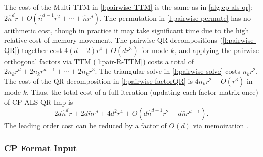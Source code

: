 \documentclass{article}
\begin{document}
\begin{algorithm}
  \caption{CP-ALS-QR-Imp}
  \label{alg:cp-als-pairwise-qr}
  
\end{algorithm}

The cost of the Multi-TTM in \cref{l:pairwise-TTM} is the same as in \cref{alg:cp-als-qr}: $2\hat{n}^dr+O(\hat{n}^{d-1}r^2 + \cdots + \hat{n}r^d)$.
The permutation in \cref{l:pairwise-permute} has no arithmetic cost, though in practice it may take significant time due to the high relative cost of memory movement.
The pairwise QR decompositions (\cref{l:pairwise-QR}) together cost $4(d-2)r^4 + O(dr^3)$ for mode $k$, and applying the pairwise orthogonal factors via TTM (\cref{l:pair-R-TTM}) costs a total of $2n_kr^d+2n_kr^{d-1}+\cdots+2n_kr^3$.
The triangular solve in \cref{l:pairwise-solve} costs $n_kr^2$.
The cost of the QR decomposition in \cref{l:pairwise-factorQR} is $4n_kr^2+O(r^3)$ in mode $k$.
Thus, the total cost of a full iteration (updating each factor matrix once) of CP-ALS-QR-Imp is
$$ 2d\hat{n}^dr + 2d\bar{n}r^d + 4d^2r^4 + O(d\hat{n}^{d-1}r^2 + d\bar{n}r^{d-1}). $$
The leading order cost can be reduced by a factor of $O(d)$ via memoization \cite{KR19}.

\subsubsection{CP Format Input} 
\label{sec:QR-PW-k}
\end{document}
